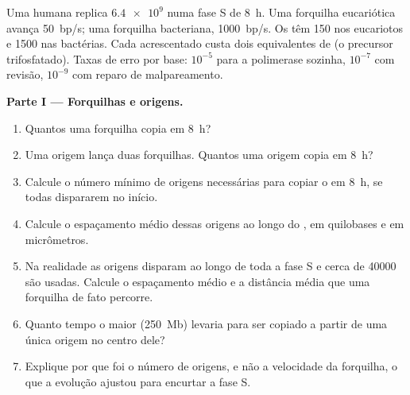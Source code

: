 \begin{problem}
\label{pb:b1:replication-mitosis:1}
Uma  humana replica $\num{6.4e9}$  numa fase S de
\qty{8}{h}. Uma forquilha eucariótica avança \qty{50}{bp/s}; uma
forquilha bacteriana, \qty{1000}{bp/s}. Os  têm
\qty{150}{}  nos eucariotos e \qty{1500}{} nas bactérias.
Cada  acrescentado custa dois equivalentes de  (o
precursor trifosfatado). Taxas de erro por base: $10^{-5}$ para a
polimerase sozinha, $10^{-7}$ com revisão, $10^{-9}$ com reparo de
malpareamento.

\medskip
\noindent\textbf{Parte I --- Forquilhas e origens.}
\begin{enumerate}
  \item Quantos  uma forquilha copia em \qty{8}{h}?
  \item Uma origem lança duas forquilhas. Quantos  uma
        origem copia em \qty{8}{h}?
  \item Calcule o número mínimo de origens necessárias para copiar o
         em \qty{8}{h}, se todas dispararem no início.
  \item Calcule o espaçamento médio dessas origens ao longo do , em
        quilobases e em micrômetros.
  \item Na realidade as origens disparam ao longo de toda a fase S e
        cerca de \num{40000} são usadas. Calcule o espaçamento médio e a
        distância média que uma forquilha de fato percorre.
  \item Quanto tempo o maior  (\qty{250}{Mb}) levaria para ser
        copiado a partir de uma única origem no centro dele?
  \item Explique por que foi o número de origens, e não a velocidade da
        forquilha, o que a evolução ajustou para encurtar a fase S.
\end{enumerate}


\end{problem}
